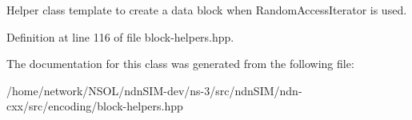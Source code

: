 Helper class template to create a data block when Random\+Access\+Iterator is used. 

Definition at line 116 of file block-\/helpers.\+hpp.



The documentation for this class was generated from the following file\+:\begin{DoxyCompactItemize}
\item 
/home/network/\+N\+S\+O\+L/ndn\+S\+I\+M-\/dev/ns-\/3/src/ndn\+S\+I\+M/ndn-\/cxx/src/encoding/block-\/helpers.\+hpp\end{DoxyCompactItemize}
